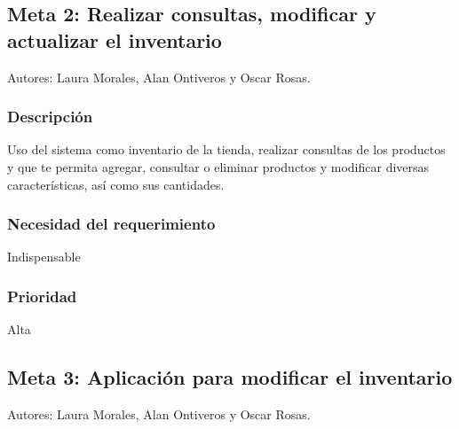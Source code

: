 \documentclass[12pt, fleqn]{report}                             %
\theoremstyle{break}                                            %
\begin{document}
    
    
    
    
    
    \subsection{Meta 2: Realizar consultas, modificar y actualizar el inventario}
    Autores: Laura Morales, Alan Ontiveros y Oscar Rosas.
    
   \subsubsection{Descripción}
   Uso del sistema como inventario de la tienda, realizar consultas de los productos y que te permita agregar, consultar o eliminar productos y modificar diversas características, así como sus cantidades.
    \subsubsection{Necesidad del requerimiento}
    Indispensable
    \subsubsection{Prioridad}
    Alta
    
    \subsection{Meta 3: Aplicación para modificar el inventario}
    Autores: Laura Morales, Alan Ontiveros y Oscar Rosas.
    
\end{document}
